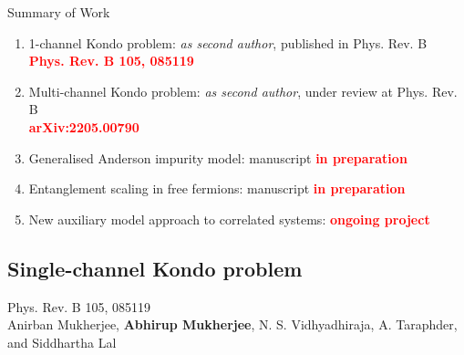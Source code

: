 \documentclass[11pt,aspectratio=169]{beamer}
\newcommand{\focus}[1]{\textcolor{red}{\bf{#1}}}
\begin{document}
\begin{frame}{Summary of Work}
\begin{enumerate}
\item 1-channel Kondo problem: {\it as second author}, {published} in Phys. Rev. B\\
	\focus{Phys. Rev. B 105, 085119}\\[20pt]
	\item Multi-channel Kondo problem: {\it as second author}, {under review} at Phys. Rev. B\\
		\focus{arXiv:2205.00790}\\[20pt]
	\item Generalised Anderson impurity model: manuscript \focus{in preparation}\\[20pt]
	\item Entanglement scaling in free fermions: manuscript \focus{in preparation}\\[20pt]
	\item New auxiliary model approach to correlated systems: \focus{ongoing project}
\end{enumerate}

\end{frame}

\begin{frame}{}
\section{Single-channel Kondo problem}
\small{Phys. Rev. B 105, 085119\\[10pt]
Anirban Mukherjee, {\bf Abhirup Mukherjee}, N. S. Vidhyadhiraja, A. Taraphder, and Siddhartha Lal}
\end{frame}
\end{document}
